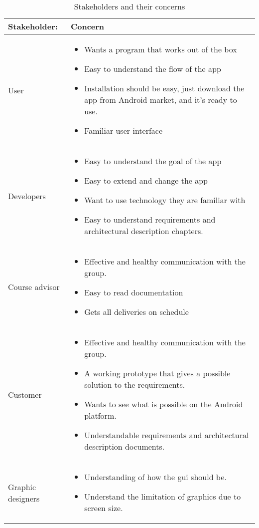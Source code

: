 \begin{table}
\begin{tabular}{p{3.5cm}|p{11.5cm}}
\textbf{Stakeholder:} & \textbf{Concern} \\ \hline \hline
User & 
\begin{itemize}
\item{} Wants a program that works out of the box
\item{} Easy to understand the flow of the app
\item{} Installation should be easy, just download the app from Android market, and it’s ready to use.
\item{} Familiar user interface
\end{itemize}\\ \hline
Developers & 
\begin{itemize}
\item{}Easy to understand the goal of the app
\item{}Easy to extend and change the app
\item{}Want to use technology they are familiar with
\item{}Easy to understand requirements and architectural description chapters.
\end{itemize}\\ \hline
Course advisor & 
\begin{itemize}
\item{}Effective and healthy communication with the group.
\item{}Easy to read documentation
\item{}Gets all deliveries on schedule
\end{itemize}\\ \hline
Customer & 
\begin{itemize}
\item{}Effective and healthy communication with the group.
\item{}A working prototype that gives a possible solution to the requirements.
\item{}Wants to see what is possible on the Android platform.
\item{}Understandable requirements and architectural description documents.
\end{itemize}\\ \hline
Graphic designers & 
\begin{itemize}
\item{}Understanding of how the \gls{gui} should be.
\item{}Understand the limitation of graphics due to screen size.
\end{itemize}
\end{tabular}
\caption{Stakeholders and their concerns} \label{tab:stakeholders}
\end{table}